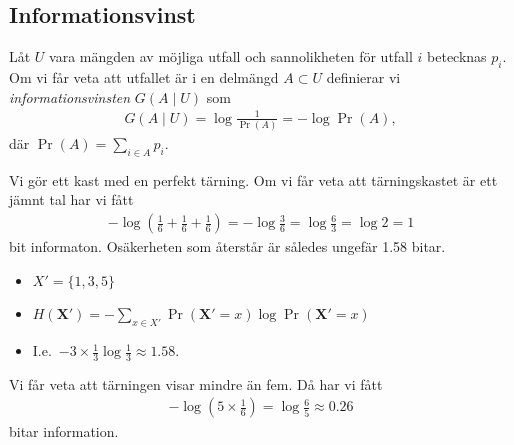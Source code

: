 \documentclass{beamer}
\let\stoch\mathbf{}
\begin{document}
\subsection{Informationsvinst}

\begin{frame}
  \begin{definition}
    Låt \(U\) vara mängden av möjliga utfall och sannolikheten för utfall \(i\) 
    betecknas \(p_i\).
    Om vi får veta att utfallet är i en delmängd \(A\subset U\) definierar vi 
    \emph{informationsvinsten} \(G(A\mid U)\) som
    \begin{align*}
      G(A\mid U) = \log\frac{1}{\Pr(A)} = -\log\Pr(A),
    \end{align*}
    där \(\Pr(A) = \sum_{i\in A} p_i\).
  \end{definition}
\end{frame}

\begin{frame}
  \begin{example}
    Vi gör ett kast med en perfekt tärning.
    Om vi får veta att tärningskastet är ett jämnt tal har vi fått
    \begin{align*}
      -\log\left( \frac{1}{6} + \frac{1}{6} + \frac{1}{6}\right) =
      -\log\frac{3}{6} = \log\frac{6}{3} = \log 2 = 1
    \end{align*}
    bit informaton.
    Osäkerheten som återstår är således ungefär 1.58 bitar.
  \end{example}

  \pause{}

  \begin{remark}
    \begin{itemize}
      \item \(X' = \{1, 3, 5\}\)
      \item \(H(\stoch X') = - \sum_{x\in X'} \Pr(\stoch X' = x)\log \Pr(\stoch 
          X' = x)\)
      \item I.e.\ \(- 3 \times \frac{1}{3}\log\frac{1}{3} \approx 1.58\).
    \end{itemize}
  \end{remark}
\end{frame}

\begin{frame}
  \begin{example}
    Vi får veta att tärningen visar mindre än fem.
    Då har vi fått
    \begin{align*}
      -\log\left( 5\times\frac{1}{6}\right) = \log\frac{6}{5}\approx 0.26
    \end{align*}
    bitar information.
  \end{example}
\end{frame}
\end{document}
